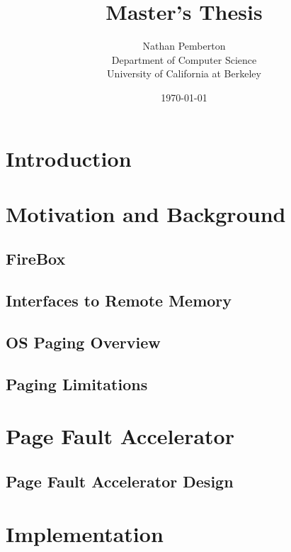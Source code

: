 \documentclass[12pt]{article}
\title{Master's Thesis}
\author{
        Nathan Pemberton \\
                Department of Computer Science \\
                University of California at Berkeley
}
\date{\today}
\begin{document}
\maketitle

\newpage



\newpage
\tableofcontents
\newpage

\section{Introduction} \label{sec:intro}
    

\section{Motivation and Background}
    \subsection{FireBox} \label{sec:firebox}
        
    \subsection{Interfaces to Remote Memory} \label{sec:rmemApproaches}
        
    \subsection{OS Paging Overview} \label{sec:pagingOverview}
        
    \subsection{Paging Limitations} \label{sec:pagingLimits}
        
        
\section{Page Fault Accelerator} \label{sec:pfa}
    
    \subsection{Page Fault Accelerator Design} \label{sec:pfaDesign}
        
        
\section{Implementation} \label{sec:impl}
    
\end{document}
